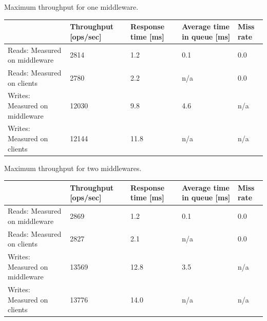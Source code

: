 \documentclass[report.tex]{subfiles}
\begin{document}

\begin{center}
	{Maximum throughput for one middleware.}
	\begin{tabular}{|l|p{2cm}|p{2cm}|p{2cm}|p{2cm}|}
		\hline                                & Throughput [ops/sec] & Response time [ms] & Average time in queue [ms] & Miss rate \\ 
		\hline Reads: Measured on middleware  &                 2814 &                1.2 &                        0.1 & 0.0       \\ 
		\hline Reads: Measured on clients     &                 2780 &                2.2 &                        n/a & 0.0       \\ 
		\hline Writes: Measured on middleware &                12030 &                9.8 &                        4.6 & n/a       \\ 
		\hline Writes: Measured on clients    &                12144 &                11.8 &                       n/a & n/a       \\ 
		\hline 
	\end{tabular}
\end{center}

\begin{center}
	{Maximum throughput for two middlewares.}
	\begin{tabular}{|l|p{2cm}|p{2cm}|p{2cm}|p{2cm}|}
		\hline                                & Throughput [ops/sec] & Response time [ms] & Average time in queue [ms] & Miss rate \\ 
		\hline Reads: Measured on middleware  &                 2869 &                1.2 &                        0.1 & 0.0       \\ 
		\hline Reads: Measured on clients     &                 2827 &                2.1 &                        n/a & 0.0       \\ 
		\hline Writes: Measured on middleware &                13569 &               12.8 &                        3.5 & n/a       \\ 
		\hline Writes: Measured on clients    &                13776 &               14.0 &                        n/a & n/a       \\ 
		\hline 
	\end{tabular}
\end{center}
\end{document}
